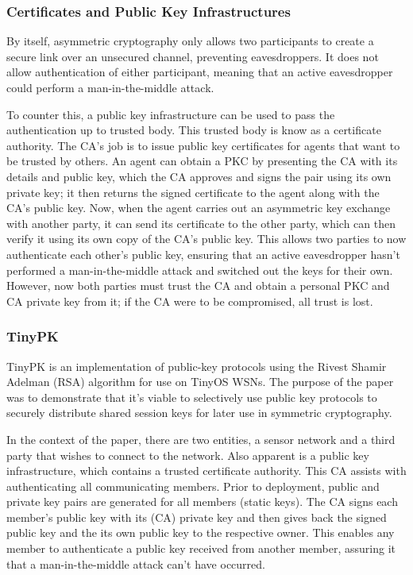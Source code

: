 \documentclass{mprop}
\begin{document}
\subsubsection{Certificates and Public Key Infrastructures} %
\label{ssub:certificates_and_public_key_infrastructures}
By itself, asymmetric cryptography only allows two participants to create a secure link over an unsecured channel, preventing eavesdroppers. It does not allow authentication of either participant, meaning that an active eavesdropper could perform a man-in-the-middle attack. 

To counter this, a public key infrastructure can be used to pass the authentication up to trusted body. This trusted body is know as a certificate authority. The CA's job is to issue public key certificates for agents that want to be trusted by others. An agent can obtain a PKC by presenting the CA with its details and public key, which the CA approves and signs the pair using its own private key; it then returns the signed certificate to the agent along with the CA's public key. Now, when the agent carries out an asymmetric key exchange with another party, it can send its certificate to the other party, which can then verify it using its own copy of the CA's public key. This allows two parties to now authenticate each other's public key, ensuring that an active eavesdropper hasn't performed a man-in-the-middle attack and switched out the keys for their own. However, now both parties must trust the CA and obtain a personal PKC and CA private key from it; if the CA were to be compromised, all trust is lost.


\subsubsection{TinyPK} %
\label{ssub:tinypk}
TinyPK is an implementation of public-key protocols using the Rivest Shamir Adelman (RSA) algorithm for use on TinyOS WSNs\cite{TinyPK}. The purpose of the paper was to demonstrate that it's viable to selectively use public key protocols to securely distribute shared session keys for later use in symmetric cryptography.

In the context of the paper, there are two entities, a sensor network and a third party that wishes to connect to the network. Also apparent is a public key infrastructure, which contains a trusted certificate authority. This CA assists with authenticating all communicating members. Prior to deployment, public and private key pairs are generated for all members (static keys). The CA signs each member's public key with its (CA) private key and then gives back the signed public key and the its own public key to the respective owner. This enables any member to authenticate a public key received from another member, assuring it that a man-in-the-middle attack can't have occurred.
\end{document}
